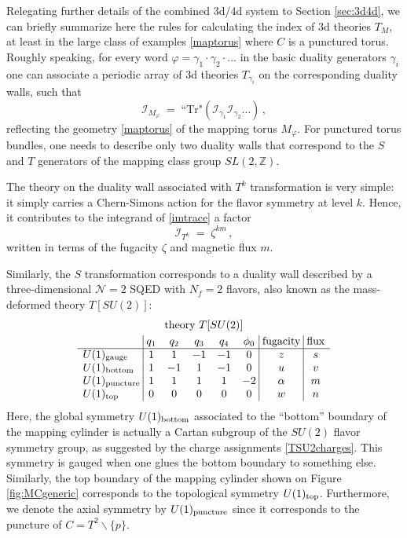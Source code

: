 \documentclass[11pt,letterpaper]{article}
\numberwithin{equation}{section}
\newcommand{\be}{\begin{equation}}
\newcommand{\ee}{\end{equation}}
\newcommand{\Z}{{\mathbb Z}}
\newcommand{\bs}{\backslash}
\newcommand{\CI}{\mathcal{I}}
\newcommand{\CN}{\mathcal{N}}
\begin{document}
Relegating further details of the combined 3d/4d system to Section \ref{sec:3d4d},
we can briefly summarize here the rules for calculating the index of 3d theories $T_M$,
at least in the large class of examples \eqref{maptorus} where $C$ is a punctured torus.
Roughly speaking, for every word $\varphi = \gamma_1 \cdot \gamma_2 \cdot \ldots$
in the basic duality generators $\gamma_i$ one can associate a periodic array of 3d theories $T_{\gamma_i}$
on the corresponding duality walls, such that
\be
\CI_{M_{\varphi}} \; = \; \text{``Tr"} \left( \CI_{\gamma_1} \CI_{\gamma_2} \ldots \right)\,,
\label{imtrace}
\ee
reflecting the geometry \eqref{maptorus} of the mapping torus $M_{\varphi}$.
For punctured torus bundles, one needs to describe only two duality walls that correspond to
the $S$ and $T$ generators of the mapping class group $SL(2,\Z)$.

The theory on the duality wall associated with $T^k$ transformation is very simple:
it simply carries a Chern-Simons action for the flavor symmetry at level $k$.
Hence, it contributes to the integrand of \eqref{imtrace} a factor
\be
\CI_{T^k} \; = \; \zeta^{k m}\,,
\ee
written in terms of the fugacity $\zeta$ and magnetic flux $m$.

Similarly, the $S$ transformation corresponds to a duality wall
described by a three-dimensional $\CN=2$ SQED with $N_f =2$ flavors,
also known as the mass-deformed theory $T[SU(2)]$:
\be
\begin{array}{l@{\;}|@{\;}ccccc@{\;}|@{\;}c@{\;}|@{\;}c}
\multicolumn{8}{c}{\text{theory}~T[SU(2)]} \\[.1cm]
& q_1 & q_2 & q_3 & q_4 & \phi_0 & \text{fugacity} & \text{flux} \\\hline
U(1)_{\rm gauge} & 1 & 1 & -1 & -1 & 0 & z & s \\
U(1)_{\rm bottom} & 1 & -1 & 1 & -1 & 0 & u & v \\
U(1)_{\rm puncture} & 1 & 1 & 1 & 1 & -2 & \alpha & m \\
U(1)_{\rm top} & 0 & 0 & 0 & 0 & 0 & w & n
\end{array}
\label{TSU2charges} \ee
Here, the global symmetry $U(1)_{\rm bottom}$ associated to the ``bottom'' boundary
of the mapping cylinder is actually a Cartan subgroup of the $SU(2)$ flavor symmetry group,
as suggested by the charge assignments \eqref{TSU2charges}.
This symmetry is gauged when one glues the bottom boundary to something else.
Similarly, the top boundary of the mapping cylinder shown on Figure \ref{fig:MCgeneric} corresponds to the topological symmetry $U(1)_{\rm top}$.
Furthermore, we denote the axial symmetry by $U(1)_{\rm puncture}$ since it corresponds to the puncture of $C=T^2\bs\{p\}$.
\end{document}
